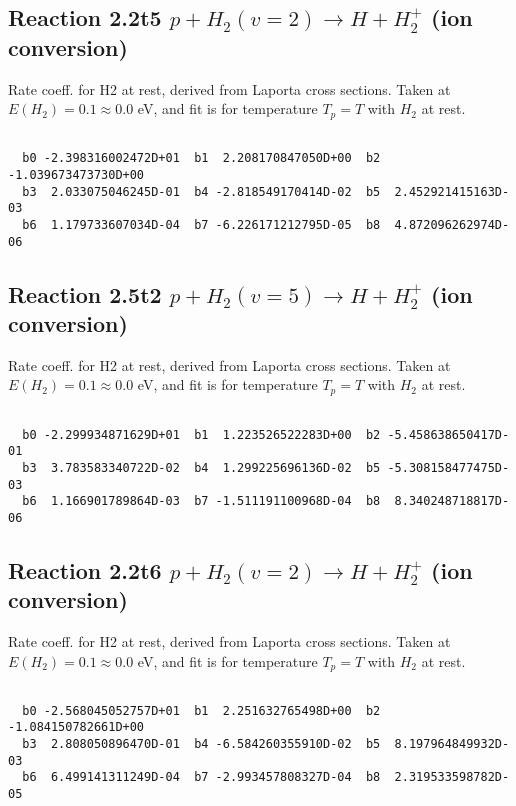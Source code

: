\documentclass[12pt,dvipdfmx]{article}
\begin{document}
\newpage
\subsection{
Reaction 2.2t5
$ p + H_2(v=2) \rightarrow H + H_2^+$ (ion conversion)
}
Rate coeff. for H2 at rest, derived from Laporta cross sections.
Taken at $E(H_2) = 0.1 \approx 0.0$ eV,  and fit is for temperature $T_p=T$ with $H_2$ at rest.

\begin{small}\begin{verbatim}

  b0 -2.398316002472D+01  b1  2.208170847050D+00  b2 -1.039673473730D+00
  b3  2.033075046245D-01  b4 -2.818549170414D-02  b5  2.452921415163D-03
  b6  1.179733607034D-04  b7 -6.226171212795D-05  b8  4.872096262974D-06

\end{verbatim}\end{small}

\newpage
\subsection{
Reaction 2.5t2
$ p + H_2(v=5) \rightarrow H + H_2^+$ (ion conversion)
}
Rate coeff. for H2 at rest, derived from Laporta cross sections.
Taken at $E(H_2) = 0.1 \approx 0.0$ eV,  and fit is for temperature $T_p=T$ with $H_2$ at rest.

\begin{small}\begin{verbatim}

  b0 -2.299934871629D+01  b1  1.223526522283D+00  b2 -5.458638650417D-01
  b3  3.783583340722D-02  b4  1.299225696136D-02  b5 -5.308158477475D-03
  b6  1.166901789864D-03  b7 -1.511191100968D-04  b8  8.340248718817D-06

\end{verbatim}\end{small}

\newpage
\subsection{
Reaction 2.2t6
$ p + H_2(v=2) \rightarrow H + H_2^+$ (ion conversion)
}
Rate coeff. for H2 at rest, derived from Laporta cross sections.
Taken at $E(H_2) = 0.1 \approx 0.0$ eV,  and fit is for temperature $T_p=T$ with $H_2$ at rest.

\begin{small}\begin{verbatim}

  b0 -2.568045052757D+01  b1  2.251632765498D+00  b2 -1.084150782661D+00
  b3  2.808050896470D-01  b4 -6.584260355910D-02  b5  8.197964849932D-03
  b6  6.499141311249D-04  b7 -2.993457808327D-04  b8  2.319533598782D-05

\end{verbatim}\end{small}
\end{document}
